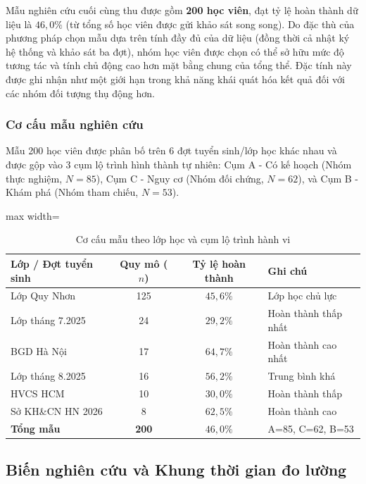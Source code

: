 Mẫu nghiên cứu cuối cùng thu được gồm \textbf{200 học viên}, đạt tỷ lệ hoàn thành dữ liệu là $46,0\%$ (từ tổng số học viên được gửi khảo sát song song). Do đặc thù của phương pháp chọn mẫu dựa trên tính đầy đủ của dữ liệu (đồng thời cả nhật ký hệ thống và khảo sát ba đợt), nhóm học viên được chọn có thể sở hữu mức độ tương tác và tính chủ động cao hơn mặt bằng chung của tổng thể. Đặc tính này được ghi nhận như một giới hạn trong khả năng khái quát hóa kết quả đối với các nhóm đối tượng thụ động hơn.

\subsubsection{Cơ cấu mẫu nghiên cứu}
Mẫu 200 học viên được phân bố trên 6 đợt tuyển sinh/lớp học khác nhau và được gộp vào 3 cụm lộ trình hình thành tự nhiên: Cụm A - Có kế hoạch (Nhóm thực nghiệm, $N = 85$), Cụm C - Nguy cơ (Nhóm đối chứng, $N = 62$), và Cụm B - Khám phá (Nhóm tham chiếu, $N = 53$).

\begin{table}[H]
\centering
\caption{Cơ cấu mẫu theo lớp học và cụm lộ trình hành vi}
\label{tab:co_cau_mau}
\begin{adjustbox}{max width=\textwidth}
\begin{tabular}{lccp{4.5cm}}
\toprule
\textbf{Lớp / Đợt tuyển sinh} & \textbf{Quy mô ($n$)} & \textbf{Tỷ lệ hoàn thành} & \textbf{Ghi chú} \\
\midrule
Lớp Quy Nhơn & 125 & $45,6\%$ & Lớp học chủ lực \\
Lớp tháng 7.2025 & 24 & $29,2\%$ & Hoàn thành thấp nhất \\
BGD Hà Nội & 17 & $64,7\%$ & Hoàn thành cao nhất \\
Lớp tháng 8.2025 & 16 & $56,2\%$ & Trung bình khá \\
HVCS HCM & 10 & $30,0\%$ & Hoàn thành thấp \\
Sở KH\&CN HN 2026 & 8 & $62,5\%$ & Hoàn thành cao \\
\midrule
\textbf{Tổng mẫu} & \textbf{200} & \textbf{$46,0\%$} & A=85, C=62, B=53 \\
\bottomrule
\end{tabular}
\end{adjustbox}
\end{table}

\subsection{Biến nghiên cứu và Khung thời gian đo lường}

